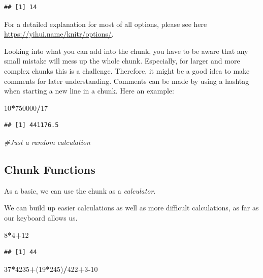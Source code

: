 \documentclass[]{report}
\newenvironment{Shaded}{\begin{snugshade}}{\end{snugshade}}
\newcommand{\DecValTok}[1]{\textcolor[rgb]{0.00,0.00,0.81}{#1}}
\newcommand{\CommentTok}[1]{\textcolor[rgb]{0.56,0.35,0.01}{\textit{#1}}}
\newcommand{\OperatorTok}[1]{\textcolor[rgb]{0.81,0.36,0.00}{\textbf{#1}}}
\newcommand{\NormalTok}[1]{#1}
\begin{document}
\begin{verbatim}
## [1] 14
\end{verbatim}

For a detailed explanation for most of all options, please see here
\url{https://yihui.name/knitr/options/}.

Looking into what you can add into the chunk, you have to be aware that
any small mistake will mess up the whole chunk. Especially, for larger
and more complex chunks this is a challenge. Therefore, it might be a
good idea to make comments for later understanding. Comments can be made
by using a hashtag when starting a new line in a chunk. Here an example:

\begin{Shaded}
\begin{Highlighting}[]
\DecValTok{10}\OperatorTok{*}\DecValTok{750000}\OperatorTok{/}\DecValTok{17}
\end{Highlighting}
\end{Shaded}

\begin{verbatim}
## [1] 441176.5
\end{verbatim}

\begin{Shaded}
\begin{Highlighting}[]
\CommentTok{#Just a random calculation}
\end{Highlighting}
\end{Shaded}

\subsection{Chunk Functions}\label{chunk-functions}

As a basic, we can use the chunk as a \emph{calculator}.

We can build up easier calculations as well as more difficult
calculations, as far as our keyboard allows us.

\begin{Shaded}
\begin{Highlighting}[]
\DecValTok{8}\OperatorTok{*}\DecValTok{4}\OperatorTok{+}\DecValTok{12}
\end{Highlighting}
\end{Shaded}

\begin{verbatim}
## [1] 44
\end{verbatim}

\begin{Shaded}
\begin{Highlighting}[]
\DecValTok{37}\OperatorTok{*}\DecValTok{4235}\OperatorTok{+}\NormalTok{(}\DecValTok{19}\OperatorTok{*}\DecValTok{245}\NormalTok{)}\OperatorTok{/}\DecValTok{422}\OperatorTok{+}\DecValTok{3}\OperatorTok{-}\DecValTok{10}
\end{Highlighting}
\end{Shaded}
\end{document}

